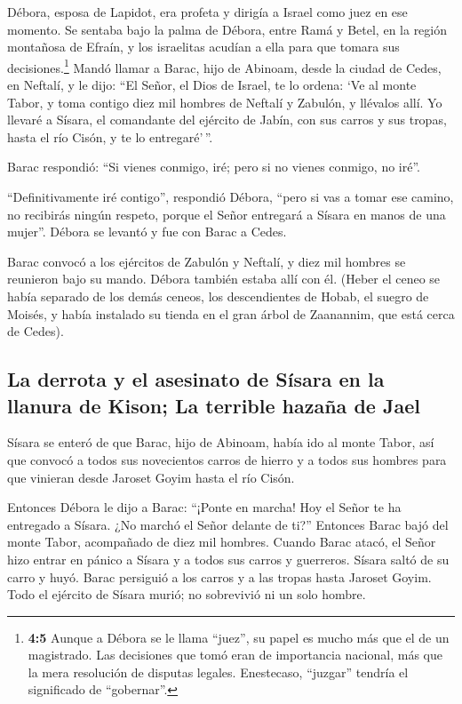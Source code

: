  Débora, esposa de Lapidot, era profeta y dirigía a Israel
como juez en ese momento.  Se sentaba bajo la palma de
Débora, entre Ramá y Betel, en la región montañosa de Efraín, y los
israelitas acudían a ella para que tomara sus decisiones.\footnote{\textbf{4:5}
  Aunque a Débora se le llama ``juez'', su papel es mucho más que el de
  un magistrado. Las decisiones que tomó eran de importancia nacional,
  más que la mera resolución de disputas legales. Enestecaso, ``juzgar''
  tendría el significado de ``gobernar''.}  Mandó llamar a
Barac, hijo de Abinoam, desde la ciudad de Cedes, en Neftalí, y le dijo:
``El Señor, el Dios de Israel, te lo ordena: `Ve al monte Tabor, y toma
contigo diez mil hombres de Neftalí y Zabulón, y llévalos allí.
 Yo llevaré a Sísara, el comandante del ejército de Jabín,
con sus carros y sus tropas, hasta el río Cisón, y te lo entregaré'\,''.

 Barac respondió: ``Si vienes conmigo, iré; pero si no
vienes conmigo, no iré''.

 ``Definitivamente iré contigo'', respondió Débora, ``pero
si vas a tomar ese camino, no recibirás ningún respeto, porque el Señor
entregará a Sísara en manos de una mujer''. Débora se levantó y fue con
Barac a Cedes.

 Barac convocó a los ejércitos de Zabulón y Neftalí, y
diez mil hombres se reunieron bajo su mando. Débora también estaba allí
con él.  (Heber el ceneo se había separado de los demás
ceneos, los descendientes de Hobab, el suegro de Moisés, y había
instalado su tienda en el gran árbol de Zaanannim, que está cerca de
Cedes).

\hypertarget{la-derrota-y-el-asesinato-de-suxedsara-en-la-llanura-de-kison-la-terrible-hazauxf1a-de-jael}{%
\subsection{La derrota y el asesinato de Sísara en la llanura de Kison;
La terrible hazaña de
Jael}\label{la-derrota-y-el-asesinato-de-suxedsara-en-la-llanura-de-kison-la-terrible-hazauxf1a-de-jael}}

 Sísara se enteró de que Barac, hijo de Abinoam, había
ido al monte Tabor,  así que convocó a todos sus
novecientos carros de hierro y a todos sus hombres para que vinieran
desde Jaroset Goyim hasta el río Cisón.

 Entonces Débora le dijo a Barac: ``¡Ponte en marcha! Hoy
el Señor te ha entregado a Sísara. ¿No marchó el Señor delante de ti?''
Entonces Barac bajó del monte Tabor, acompañado de diez mil hombres.
 Cuando Barac atacó, el Señor hizo entrar en pánico a
Sísara y a todos sus carros y guerreros. Sísara saltó de su carro y
huyó.  Barac persiguió a los carros y a las tropas hasta
Jaroset Goyim. Todo el ejército de Sísara murió; no sobrevivió ni un
solo hombre.


